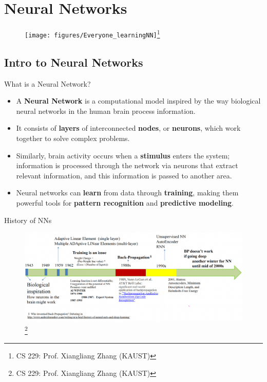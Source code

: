 \documentclass[10pt, hyperref={colorlinks = true,linkcolor = blue}]{beamer}
\begin{document}
{
\section[Neural Networks]{Neural Networks}

\begin{frame}
\begin{figure}
\texttt{[image: figures/Everyone\_learningNN]}\footnote{CS 229: Prof. Xiangliang Zhang (KAUST)}
\end{figure}
\end{frame}

{
\subsection{Intro to Neural Networks}

\begin{frame}{What is a Neural Network?}
 \begin{itemize}[<+->]
    \item A \textbf{Neural Network} is a computational model inspired by the way biological neural networks in the human brain process information.
    \item It consists of \textbf{layers} of interconnected \textbf{nodes}, or \textbf{neurons}, which work together to solve complex problems.
     \item Similarly, brain activity occurs when a \textbf{stimulus} enters the system; information is processed through the network via neurons that extract relevant information, and this information is passed to another area.
    \item Neural networks can \textbf{learn} from data through \textbf{training}, making them powerful tools for \textbf{pattern recognition} and \textbf{predictive modeling}.
\end{itemize}
\end{frame}

\begin{frame}{History of NNs}
\begin{figure}
\includegraphics[width=1\linewidth]{figures/NN-history.pdf}\footnote{CS 229: Prof. Xiangliang Zhang (KAUST)}
\end{figure}
\end{frame}

}}
\end{document}
